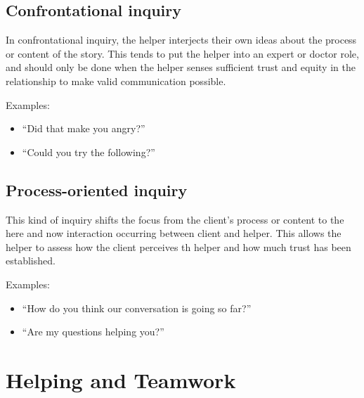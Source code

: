 \documentclass{article}
\newenvironment{nosepitemize}
{ \begin{itemize}
    \setlength{\itemsep}{0pt}
    \setlength{\parskip}{0pt}
    \setlength{\parsep}{0pt}     }
{ \end{itemize}                  }
\begin{document}
\begin{multicols}{2}
\subsection{Confrontational inquiry}

In confrontational inquiry, the helper interjects their own ideas about the process or content of the story. This tends to put the helper into an expert or doctor role, and should only be done when the helper senses sufficient trust and equity in the relationship to make valid communication possible.

\noindent
Examples:
\begin{nosepitemize}
    \item ``Did that make you angry?''
    \item ``Could you try the following?''
\end{nosepitemize}

\subsection{Process-oriented inquiry}

This kind of inquiry shifts the focus from the client's process or content to the here and now interaction occurring between client and helper. This allows the helper to assess how the client perceives th helper and how much trust has been established.

\noindent
Examples:
\begin{nosepitemize}
    \item ``How do you think our conversation is going so far?''
    \item ``Are my questions helping you?''
\end{nosepitemize}

\end{multicols}

\section{Helping and Teamwork}
\end{document}
